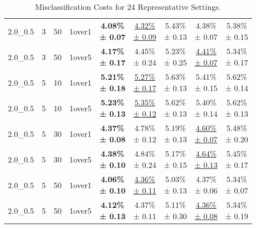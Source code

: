 \begin{table}[ht]
\begin{tabular}{lcccccccc}
2.0_0.5 & 3 & 50 & 1over1 & \textbf{4.08\% ± 0.07} & \underline{4.32\% ± 0.09} & 5.43\% ± 0.13 & 4.38\% ± 0.07 & 5.38\% ± 0.15 \\
2.0_0.5 & 3 & 50 & 1over5 & \textbf{4.17\% ± 0.17} & 4.45\% ± 0.24 & 5.23\% ± 0.25 & \underline{4.41\% ± 0.07} & 5.34\% ± 0.17 \\
2.0_0.5 & 5 & 10 & 1over1 & \textbf{5.21\% ± 0.18} & \underline{5.27\% ± 0.17} & 5.63\% ± 0.13 & 5.41\% ± 0.15 & 5.62\% ± 0.14 \\
2.0_0.5 & 5 & 10 & 1over5 & \textbf{5.23\% ± 0.13} & \underline{5.35\% ± 0.12} & 5.62\% ± 0.13 & 5.40\% ± 0.14 & 5.62\% ± 0.13 \\
2.0_0.5 & 5 & 30 & 1over1 & \textbf{4.37\% ± 0.08} & 4.78\% ± 0.12 & 5.19\% ± 0.13 & \underline{4.60\% ± 0.07} & 5.48\% ± 0.20 \\
2.0_0.5 & 5 & 30 & 1over5 & \textbf{4.38\% ± 0.10} & 4.84\% ± 0.24 & 5.17\% ± 0.15 & \underline{4.64\% ± 0.13} & 5.45\% ± 0.17 \\
2.0_0.5 & 5 & 50 & 1over1 & \textbf{4.06\% ± 0.10} & \underline{4.36\% ± 0.11} & 5.03\% ± 0.13 & 4.37\% ± 0.06 & 5.34\% ± 0.07 \\
2.0_0.5 & 5 & 50 & 1over5 & \textbf{4.12\% ± 0.13} & 4.37\% ± 0.11 & 5.11\% ± 0.30 & \underline{4.36\% ± 0.08} & 5.34\% ± 0.19 \\
\bottomrule
\end{tabular}
\caption{Misclassification Costs for 24 Representative Settings.}
\label{tab:24settings}
\end{table}